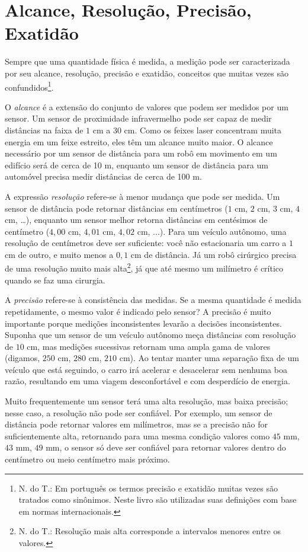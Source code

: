 \section{Alcance, Resolução, Precisão, Exatidão}\label{s.range}

Sempre que uma quantidade física é medida, a medição pode ser caracterizada por seu alcance, resolução, precisão e exatidão, conceitos que muitas vezes são confundidos\footnote{N. do T.: Em português os termos precisão e exatidão muitas vezes são tratados como sinônimos. Neste livro são utilizadas suas definições com base em normas internacionais.}.

O \emph{alcance} é a extensão do conjunto de valores que podem ser medidos por um sensor. Um sensor de proximidade infravermelho pode ser capaz de medir distâncias na faixa de $1$ cm a $30$ cm. Como os feixes laser concentram muita energia em um feixe estreito, eles têm um alcance muito maior. O alcance necessário por um sensor de distância para um robô em movimento em um edifício será de cerca de 10 m, enquanto um sensor de distância para um automóvel precisa medir distâncias de cerca de 100 m.

A expressão \emph{resolução} refere-se à menor mudança que pode ser medida. Um sensor de distância pode retornar distâncias em centímetros ($1$ cm, $2$ cm, $3$ cm, $4$ cm, \ldots), enquanto um sensor melhor retorna distâncias em centésimos de centímetro ($4,\!00$ cm, $4,\!01$ cm, $4,\!02$ cm, ...). Para um veículo autônomo, uma resolução de centímetros deve ser suficiente: você não estacionaria um carro a $1$ cm de outro, e muito menos a $0,1$ cm de distância. Já um robô cirúrgico precisa de uma resolução muito mais alta\footnote{N. do T.: Resolução mais alta corresponde a intervalos menores entre os valores.}, já que até mesmo um milímetro é crítico quando se faz uma cirurgia.

A \emph{precisão} refere-se à consistência das medidas. Se a mesma quantidade é medida repetidamente, o mesmo valor é indicado pelo sensor? A precisão é muito importante porque medições inconsistentes levarão a decisões inconsistentes. Suponha que um sensor de um veículo autônomo meça distâncias com resolução de $10$ cm, mas medições sucessivas retornam uma ampla gama de valores (digamos, $250$ cm, $280$ cm, $210$ cm). Ao tentar manter uma separação fixa de um veículo que está seguindo, o carro irá acelerar e desacelerar sem nenhuma boa razão, resultando em uma viagem desconfortável e com desperdício de energia.

Muito frequentemente um sensor terá uma alta resolução, mas baixa precisão; nesse caso, a resolução não pode ser confiável. Por exemplo, um sensor de distância pode retornar valores em milímetros, mas se a precisão não for suficientemente alta, retornando para uma mesma condição valores como $45$ mm, $43$ mm, $49$ mm, o sensor só deve ser confiável para retornar valores dentro do centímetro ou meio centímetro mais próximo.

